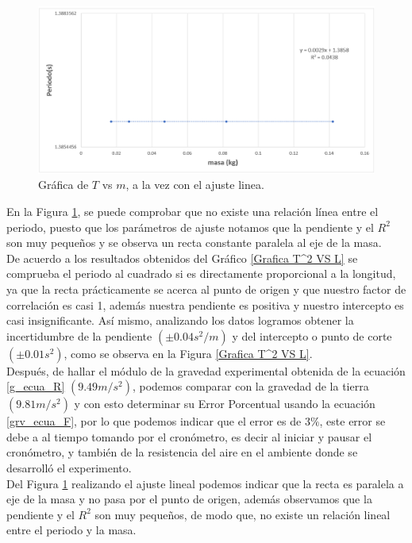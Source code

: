 \documentclass[10pt,a4paper]{article}
\begin{document}
\begin{figure}[H]
	\centering
	\includegraphics[scale=0.5]{imagenes-proyecto/grafica_Tvsm.png}
	\caption{Gráfica de $T$ vs $m$, a la vez con el ajuste linea.}
	\label{Grafica T VS m}
\end{figure}
En la Figura \ref{Grafica T VS m}, se puede comprobar que no existe una relación línea entre el periodo, puesto que los parámetros de ajuste notamos que la pendiente y el $R^2$ son muy pequeños y se observa un recta constante paralela al eje de la masa.\\

De acuerdo a los resultados obtenidos del Gráfico \ref{Grafica T^2 VS L} se comprueba el periodo al cuadrado si es directamente proporcional a la longitud, ya que la recta prácticamente se acerca al punto de origen y que nuestro factor de correlación es casi 1, además nuestra pendiente es positiva y nuestro intercepto es casi insignificante. Así mismo, analizando los datos logramos obtener la incertidumbre de la pendiente $(\pm 0.04 s^2/m)$ y del intercepto o punto de corte $(\pm 0.01 s^2)$, como se observa en la Figura \ref{Grafica T^2 VS L}.\\
Después, de hallar el módulo de la gravedad experimental obtenida de la ecuación \ref{g_ecua_R} $(9.49 m/s^2)$, podemos comparar con la gravedad de la tierra \cite{lange2012gravitacion} $(9.81 m/s^2)$ y con esto determinar su Error Porcentual usando la ecuación \ref{grv_ecua_F}, por lo que podemos indicar que el error es de $3\%$, este error se debe a al tiempo tomando por el cronómetro, es decir al iniciar y pausar el cronómetro, y también de la resistencia del aire en el ambiente donde se desarrolló el experimento.\\ 
Del Figura \ref{Grafica T VS m} realizando el ajuste lineal podemos indicar que la recta es paralela a eje de la masa y no pasa por el punto de origen, además observamos que la pendiente y el $R^2$ son muy pequeños, de modo que, no existe un relación lineal entre el periodo y la masa.
\end{document}

